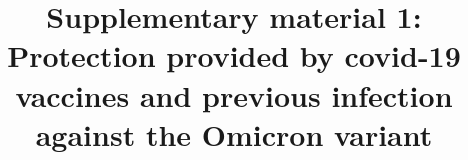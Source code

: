 \documentclass[9pt,onecolumn,twoside,lineno]{article}
\begin{document}


\title{Supplementary material 1:\\
Protection provided by covid-19 vaccines and previous infection against the Omicron variant}


\author{}


\maketitle

\setcounter{table}{0}
\renewcommand{\thetable}{S\arabic{table}}
\setcounter{figure}{0}
\renewcommand{\thefigure}{S\arabic{figure}}

\end{document}
